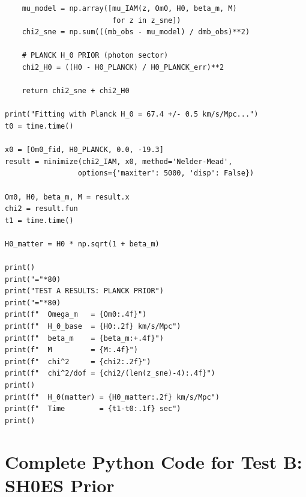 \documentclass[twocolumn,superscriptaddress,prd,amsmath,amssymb]{revtex4-2}
\begin{document}
\begin{lstlisting}
    mu_model = np.array([mu_IAM(z, Om0, H0, beta_m, M) 
                         for z in z_sne])
    chi2_sne = np.sum(((mb_obs - mu_model) / dmb_obs)**2)
    
    # PLANCK H_0 PRIOR (photon sector)
    chi2_H0 = ((H0 - H0_PLANCK) / H0_PLANCK_err)**2
    
    return chi2_sne + chi2_H0

print("Fitting with Planck H_0 = 67.4 +/- 0.5 km/s/Mpc...")
t0 = time.time()

x0 = [Om0_fid, H0_PLANCK, 0.0, -19.3]
result = minimize(chi2_IAM, x0, method='Nelder-Mead',
                 options={'maxiter': 5000, 'disp': False})

Om0, H0, beta_m, M = result.x
chi2 = result.fun
t1 = time.time()

H0_matter = H0 * np.sqrt(1 + beta_m)

print()
print("="*80)
print("TEST A RESULTS: PLANCK PRIOR")
print("="*80)
print(f"  Omega_m   = {Om0:.4f}")
print(f"  H_0_base  = {H0:.2f} km/s/Mpc")
print(f"  beta_m    = {beta_m:+.4f}")
print(f"  M         = {M:.4f}")
print(f"  chi^2     = {chi2:.2f}")
print(f"  chi^2/dof = {chi2/(len(z_sne)-4):.4f}")
print()
print(f"  H_0(matter) = {H0_matter:.2f} km/s/Mpc")
print(f"  Time        = {t1-t0:.1f} sec")
print()
\end{lstlisting}

\section{Complete Python Code for Test B: SH0ES Prior}
\label{app:test_b}
\end{document}
